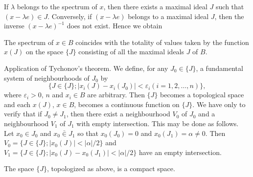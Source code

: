 If $\lambda$ belongs to the spectrum of $x$, then there exists a maximal ideal $J$ such that $(x - \lambda e) \in J$. Conversely, if $(x - \lambda e)$ belongs to a maximal ideal $J$, then the inverse $(x - \lambda e)^{-1}$ does not exist. Hence we obtain 

\begin{theorem}\label{thm:XI.2.Theorem.2} The spectrum of $x \in B$ coincides with the totality of values taken by the function $x(J)$ on the space $\{J\}$ consisting of all the maximal ideals $J$ of $B$. 
\end{theorem}

Application of Tychonov's theorem. We define, for any $J_0 \in \{J\}$, a fundamental system of neighbourhoods of $J_0$ by 
\begin{equation}\label{eq:XI.2.3}
\{J \in \{J \}; | x _{i} (J) - x _{i} (J _{0}) | < \varepsilon_{i} (i = 1, 2, \dots , n) \},
\end{equation}
where $\varepsilon_{i} > 0$, $n$ and $x_{i} \in B$ are arbitrary. Then $\{J\}$ becomes a topological space and each $x(J)$, $x \in B$, becomes a continuous function on $\{J\}$. We have only to verify that if $J_{0} \neq J_{1}$, then there exist a neighbourhood $V_{0}$ of $J_{0}$ and a neighbourhood $V_{1}$ of $J_{1}$ with empty intersection. This may be done as follows. Let $x_{0} \in J_{0}$ and $x_{0} \bar{\in} J_{1}$ so that $x_{0}(J_{0}) = 0$ and $x_{0}(J_{1}) = \alpha \neq 0$. Then $V_{0} = \{J \in \{J\}; |x_{0}(J)| < |\alpha| / 2\}$ and $V_{1} = \{J \in \{J\}; |x_{0}(J) - x_{0}(J_{1})| < |\alpha| / 2\}$ have an empty intersection. 

\begin{theorem}\label{thm:XI.2.Theorem.3} The space $\{J\}$, topologized as above, is a compact space. 
\end{theorem}

